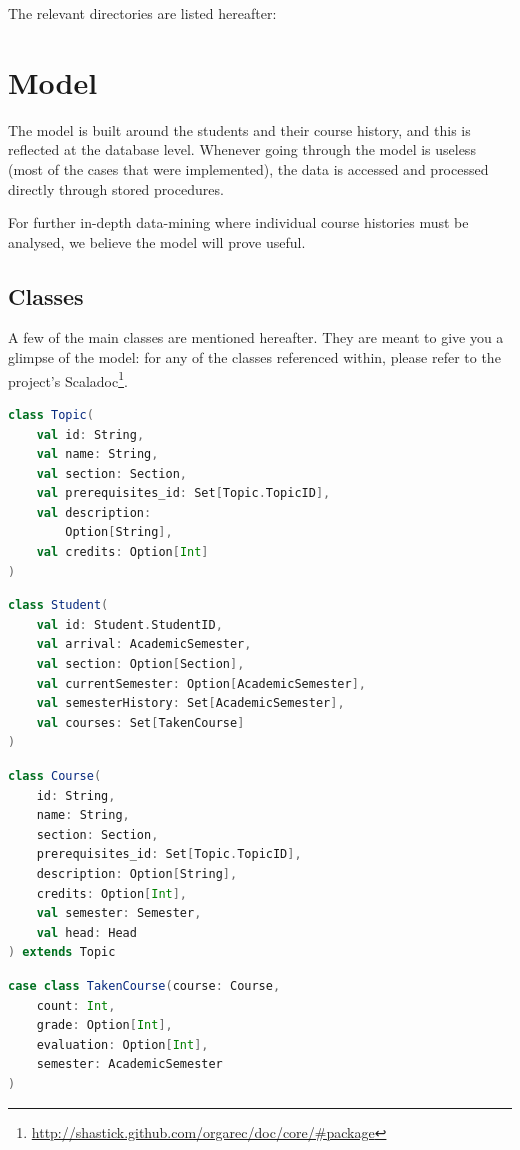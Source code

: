The relevant directories are listed hereafter:


\chapter{Model}
The model is built around the students and their course history, and this is reflected at the database level. Whenever going through the model is useless (most of the cases that were implemented), the data is accessed and processed directly through stored procedures.

For further in-depth data-mining where individual course histories must be analysed, we believe the model will prove useful.

\section{Classes}
A few of the main classes are mentioned hereafter. They are meant to give you a glimpse of the model: for any of the classes referenced within, please refer to the project's Scaladoc\footnote{\url{http://shastick.github.com/orgarec/doc/core/\#package}}.

\begin{multicols}{2}
\begin{lstlisting}[language=Scala]
class Topic(
    val id: String,
    val name: String,
    val section: Section,
    val prerequisites_id: Set[Topic.TopicID],
    val description: 
    	Option[String],
    val credits: Option[Int]
)
\end{lstlisting}

\begin{lstlisting}[language=Scala]
class Student(
    val id: Student.StudentID,
    val arrival: AcademicSemester,
    val section: Option[Section],
    val currentSemester: Option[AcademicSemester],
    val semesterHistory: Set[AcademicSemester],
    val courses: Set[TakenCourse]   
)
\end{lstlisting}

\columnbreak
\begin{lstlisting}[language=Scala]
class Course(
    id: String,
    name: String,
    section: Section,
    prerequisites_id: Set[Topic.TopicID],
    description: Option[String],
    credits: Option[Int],
    val semester: Semester,
    val head: Head
) extends Topic
\end{lstlisting}
\begin{lstlisting}[language=Scala]
case class TakenCourse(course: Course,
    count: Int,
    grade: Option[Int],
    evaluation: Option[Int],
    semester: AcademicSemester
)
\end{lstlisting}

\end{multicols}

